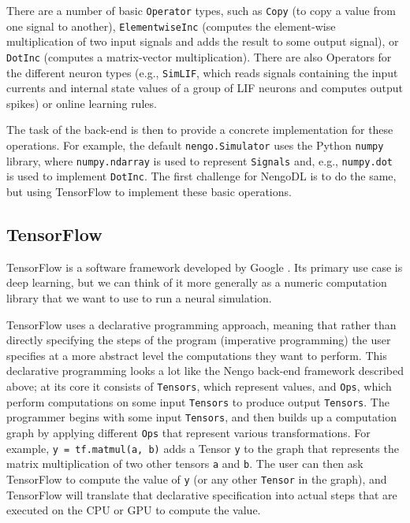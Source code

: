 \documentclass{article}
\begin{document}
There are a number of basic \texttt{Operator} types, such as \texttt{Copy} (to copy a value from one signal to another), \texttt{ElementwiseInc} (computes the element-wise multiplication of two input signals and adds the result to some output signal), or \texttt{DotInc} (computes a matrix-vector multiplication).  There are also Operators for the different neuron types (e.g., \texttt{SimLIF}, which reads signals containing the input currents and internal state values of a group of LIF neurons and computes output spikes) or online learning rules.

The task of the back-end is then to provide a concrete implementation for these operations.  For example, the default \texttt{nengo.Simulator} uses the Python \texttt{numpy} library, where \texttt{numpy.ndarray} is used to represent \texttt{Signals} and, e.g., \texttt{numpy.dot} is used to implement \texttt{DotInc}.  The first challenge for NengoDL is to do the same, but using TensorFlow to implement these basic operations.

\subsection{TensorFlow}

TensorFlow is a software framework developed by Google \citep{Abadi2016}.  Its primary use case is deep learning, but we can think of it more generally as a numeric computation library that we want to use to run a neural simulation.

TensorFlow uses a declarative programming approach, meaning that rather than directly specifying the steps of the program (imperative programming) the user specifies at a more abstract level the computations they want to perform.  This declarative programming looks a lot like the Nengo back-end framework described above; at its core it consists of \texttt{Tensors}, which represent values, and \texttt{Ops}, which perform computations on some input \texttt{Tensors} to produce output \texttt{Tensors}. The programmer begins with some input \texttt{Tensors}, and then builds up a computation graph by applying different \texttt{Ops} that represent various transformations.  For example, \texttt{y = tf.matmul(a, b)} adds a Tensor \texttt{y} to the graph that represents the matrix multiplication of two other tensors \texttt{a} and \texttt{b}.  The user can then ask TensorFlow to compute the value of \texttt{y} (or any other \texttt{Tensor} in the graph), and TensorFlow will translate that declarative specification into actual steps that are executed on the CPU or GPU to compute the value.
\end{document}
